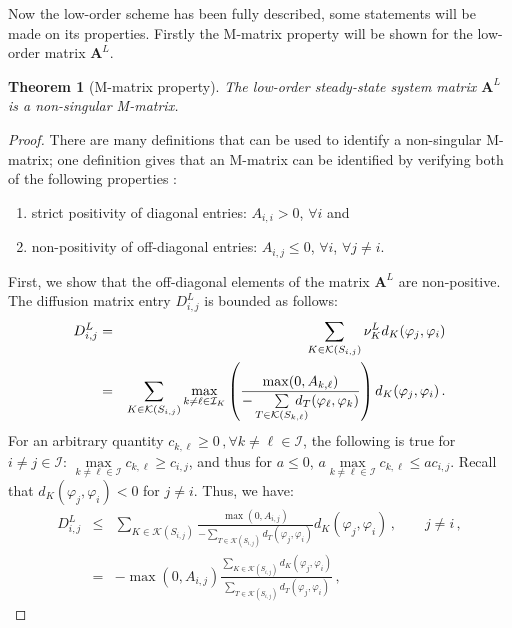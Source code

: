 \documentclass[xchauthor,chkrefs,fixeqskip,GCNS,amsmath,amsthm]{yjcphg}
\newtheorem{thm}{Theorem}
\theoremstyle{remark}
\begin{document}
Now the low-order scheme has been fully described, some statements will
be made on its properties. Firstly the M-matrix property will be shown
for the low-order matrix $\mathbf{A}^{L}$.

\begin{thm}[M-matrix property]
The low-order steady-state system matrix $\mathbf{A}^{L}$ is a
non-singular M-matrix.
\end{thm}

\begin{proof}
There are many definitions that can be used to identify a non-singular
M-matrix; one definition gives that an M-matrix can be identified by
verifying both of the following properties \cite{plemmons}:
%
\begin{enumerate}
%
\item
strict positivity of diagonal entries: $A_{i,i} > 0$, $\forall i$ and
%
\item
non-positivity of off-diagonal entries: $A_{i,j} \leq0$, $\forall i$,
$\forall j\ne i$.
\end{enumerate}
%
First, we show that the off-diagonal elements of the matrix
$\mathbf{A}^{L}$ are non-positive. The diffusion matrix entry
$D^{L}_{i,j}$ is bounded as follows:
%
\begin{eqnarray*}
D_{i,j}^{L}
& = & \sum\limits_{K\in\mathcal{K}(S_{i,j})}\nu^{L}_{K} d
_{K}(\varphi_{j},\varphi_{i})
\\
& = & \sum\limits_{K\in\mathcal{K}(S_{i,j})}\max
\limits_{k\ne\ell\in\mathcal{I}_{K}}
\left( \frac{\max(0,A_{k,
\ell})}{-\sum\limits_{T\in\mathcal{K}(S_{k,\ell})}
\mkern-20mu d
_{T}(\varphi_{\ell},\varphi_{k})}\right) d_{K}(\varphi_{j},\varphi
_{i}) \,.
\end{eqnarray*}
%
For an arbitrary quantity $c_{k,\ell} \geq0 \,,\forall k\ne\ell
\in\mathcal{I}$, the following is true for $i\ne j\in\mathcal{I}$:
$\max\limits_{k\ne\ell\in\mathcal{I}}c_{k,\ell} \geq c_{i,j}$, and
thus for $a\leq0$, $a\max\limits_{k\ne\ell\in\mathcal{I}}c_{k,
\ell} \leq a c_{i,j}$. Recall that $d_{K}(\varphi_{j},\varphi_{i}) <
0$ for $j\ne i$. Thus, we have:
%
\begin{eqnarray*}
D^{L}_{i,j}
& \le& \sum\limits_{K\in\mathcal{K}(S_{i,j})}\frac{
\max(0,A_{i,j})}{-\sum\limits_{T\in\mathcal{K}(S_{i,j})} d_{T}(
\varphi_{j},\varphi_{i})}
d_{K}(\varphi_{j},\varphi_{i}) \,,
\qquad
j\ne i\,,
\\
& = & -\max(0,A_{i,j}) \frac{\sum\limits_{K\in\mathcal{K}(S_{i,j})}d
_{K}(\varphi_{j},\varphi_{i})}{\sum\limits_{T\in\mathcal{K}(S_{i,j})}
d_{T}(\varphi_{j},\varphi_{i})} \,,

\end{eqnarray*}
\end{proof}
\end{document}
